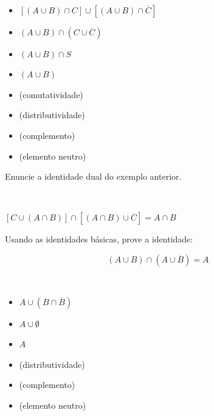 \documentclass[a4paper, 12pt, addpoints]{exam}
\begin{document}
\begin{questions}
\begin{resp}~
    
    \begin{multicols}{2}
        \begin{itemize}
            \item $[(A \cup B) \cap C] \cup \left[(A \cup B) \cap \overline{C} \right]$
            \item $(A \cup B) \cap (C \cup \overline{C})$
            \item $(A \cup B) \cap S$
            \item $(A \cup B)$
        \end{itemize}

        \begin{itemize}
            \item (comutatividade)
            \item (distributividade)
            \item (complemento)
            \item (elemento neutro)
        \end{itemize}
    \end{multicols}
\end{resp}

\question Enuncie a identidade dual do exemplo anterior.

\begin{resp}~

    $[C \cup (A \cap B)] \cap \left[(A \cap B) \cup \overline{C}\right] = A \cap B$
    
\end{resp}

\question Usando as identidades básicas, prove a identidade: 
        
\[
(A \cup B) \cap (A \cup \overline{B}) = A
\]

\begin{resp}~
    
    \begin{multicols}{2}
        \begin{itemize}
            \item $A \cup (B \cap \overline{B})$
            \item $A \cup \emptyset$
            \item $A$
        \end{itemize}

        \begin{itemize}
            \item (distributividade)
            \item (complemento)
            \item (elemento neutro)
        \end{itemize}
    \end{multicols}
\end{resp}



\end{questions}
\end{document}
